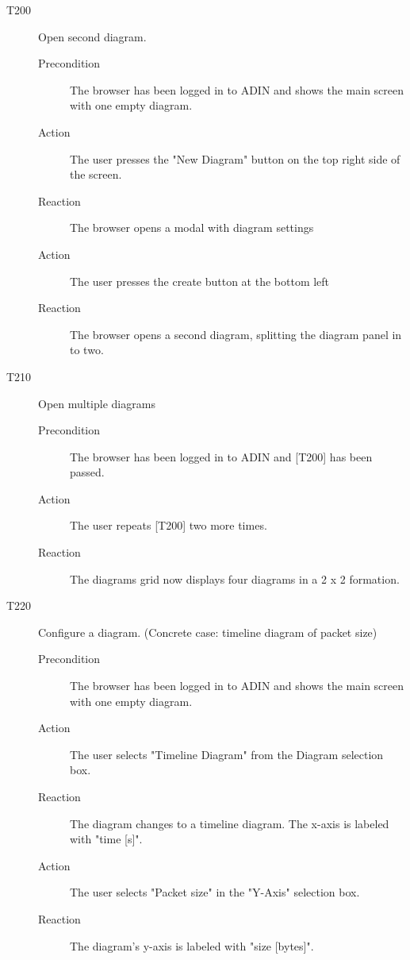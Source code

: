 \documentclass[twoside, english, final]{Pflichtenheft}
\begin{document}
\begin{description}
	\item[T200] Open second diagram.
	      \begin{description}
		      \item[Precondition]
		            The browser has been logged in to ADIN and shows the main screen with one empty diagram.
		      \item[Action]
		            The user presses the "New Diagram" button on the top right side of the screen.
		      \item[Reaction]
		            The browser opens a modal with diagram settings
		      \item[Action]
		            The user presses the create button at the bottom left
		      \item[Reaction]
		            The browser opens a second diagram, splitting the diagram panel in to two.
	      \end{description}



	\item[T210] Open multiple diagrams
	      \begin{description}
		      \item[Precondition]
		            The browser has been logged in to ADIN and [T200] has been passed.
		      \item[Action]
		            The user repeats [T200] two more times.
		      \item[Reaction]
		            The diagrams grid now displays four diagrams in a 2 x 2 formation.
	      \end{description}

	\item[T220] Configure a diagram. (Concrete case: timeline diagram of packet size)
	      \begin{description}
		      \item[Precondition]
		            The browser has been logged in to ADIN and shows the main screen with one empty diagram.
		      \item[Action]
		            The user selects "Timeline Diagram" from the Diagram selection box.
		      \item[Reaction]
		            The diagram changes to a timeline diagram. The x-axis is labeled with "time [s]".
		      \item[Action]
		            The user selects "Packet size" in the "Y-Axis" selection box.
		      \item[Reaction]
		            The diagram's y-axis is labeled with "size [bytes]".
	      \end{description}


\end{description}
\end{document}
